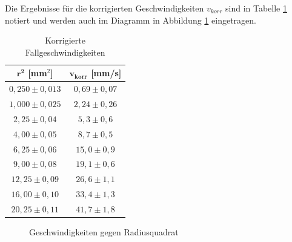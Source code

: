 \documentclass{article}
\begin{document}
Die Ergebnisse für die korrigierten Geschwindigkeiten $v_{korr}$ sind in Tabelle \ref{tab:v_korr} notiert und werden auch im Diagramm in Abbildung \ref{fig:v_gegen_r^2} eingetragen.

\phantom{.}

\begin{table}[!h]
    \centering
    \begin{tabular}{cc}
        \hline
        $\bm{r^2}$ [mm$^2$] & $\bm{v_{korr}}$ [mm/s]  \\ \hline
        $0,250 \pm  0,013$ & $0,69 \pm 0,07$     \\
        $1,000 \pm 0,025$ & $2,24 \pm 0,26$     \\
        $2,25 \pm 0,04$   & $5,3 \pm 0,6$     \\
        $4,00  \pm 0,05$  & $8,7 \pm 0,5$     \\
        $6,25  \pm 0,06$  & $15,0 \pm 0,9$     \\
        $9,00  \pm 0,08$  & $19,1 \pm 0,6$     \\
        $12,25  \pm 0,09$ & $26,6 \pm 1,1$     \\
        $16,00  \pm 0,10$ & $33,4 \pm 1,3$     \\
        $20,25  \pm 0,11$ & $41,7 \pm 1,8$     \\ \hline
    \end{tabular}%
    \caption{Korrigierte Fallgeschwindigkeiten}
    \label{tab:v_korr}
\end{table}

\phantom{.}

\begin{figure}[!h]
    \centering
    \caption{Geschwindigkeiten gegen Radiusquadrat}
    \label{fig:v_gegen_r^2}
\end{figure}
\end{document}

